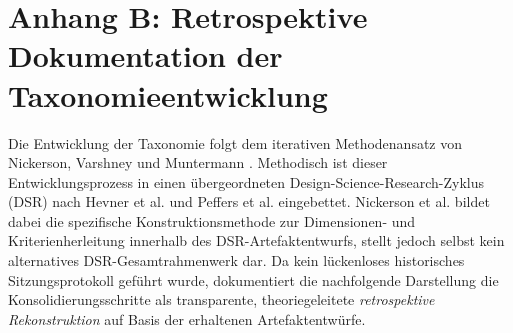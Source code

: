 \documentclass[10pt,a4paper]{article}
\begin{document}
\section*{Anhang B: Retrospektive Dokumentation der Taxonomieentwicklung}
\label{sec:anhang-b}

Die Entwicklung der Taxonomie folgt dem iterativen Methodenansatz von Nickerson, Varshney und Muntermann \cite{NVM13}. Methodisch ist dieser Entwicklungsprozess in einen übergeordneten Design-Science-Research-Zyklus (DSR) nach Hevner et al. \cite{He04} und Peffers et al. \cite{Pe07} eingebettet. Nickerson et al. bildet dabei die spezifische Konstruktionsmethode zur Dimensionen- und Kriterienherleitung innerhalb des DSR-Artefaktentwurfs, stellt jedoch selbst kein alternatives DSR-Gesamtrahmenwerk dar. Da kein lückenloses historisches Sitzungsprotokoll geführt wurde, dokumentiert die nachfolgende Darstellung die Konsolidierungsschritte als transparente, theoriegeleitete \textit{retrospektive Rekonstruktion} auf Basis der erhaltenen Artefaktentwürfe.
\end{document}
